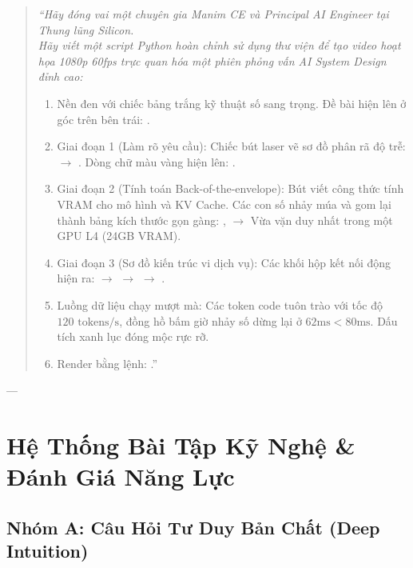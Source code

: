 \begin{simulationbox}
\begin{quote}
\small\itshape
``Hãy đóng vai một chuyên gia Manim CE và Principal AI Engineer tại Thung lũng Silicon. \\
Hãy viết một script Python hoàn chỉnh sử dụng thư viện  để tạo video hoạt họa 1080p 60fps trực quan hóa một phiên phỏng vấn AI System Design đỉnh cao:
\begin{enumerate}
  \item Nền đen với chiếc bảng trắng kỹ thuật số sang trọng. Đề bài hiện lên ở góc trên bên trái: .
  \item Giai đoạn 1 (Làm rõ yêu cầu): Chiếc bút laser vẽ sơ đồ phân rã độ trễ:  $\to$ . Dòng chữ màu vàng hiện lên: .
  \item Giai đoạn 2 (Tính toán Back-of-the-envelope): Bút viết công thức tính VRAM cho mô hình và KV Cache. Các con số nhảy múa và gom lại thành bảng kích thước gọn gàng: ,  $\to$ Vừa vặn duy nhất trong một GPU L4 (24GB VRAM).
  \item Giai đoạn 3 (Sơ đồ kiến trúc vi dịch vụ): Các khối hộp kết nối động hiện ra:  $\to$  $\to$  $\to$ .
  \item Luồng dữ liệu chạy mượt mà: Các token code tuôn trào với tốc độ $120\text{ tokens/s}$, đồng hồ bấm giờ nhảy số dừng lại ở $62\text{ms} < 80\text{ms}$. Dấu tích xanh lục  đóng mộc rực rỡ.
  \item Render bằng lệnh: .''
\end{enumerate}
\end{quote}
\end{simulationbox}

---

\section{Hệ Thống Bài Tập Kỹ Nghệ \& Đánh Giá Năng Lực}
\label{sec:ch15-exercises}

\subsection{Nhóm A: Câu Hỏi Tư Duy Bản Chất (Deep Intuition)}

